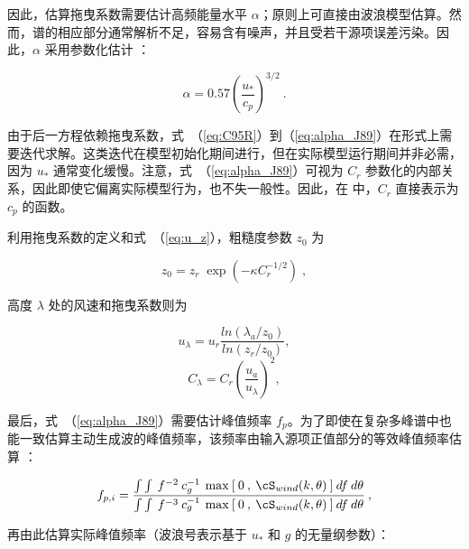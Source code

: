 因此，估算拖曳系数需要估计高频能量水平 $\alpha$；原则上可直接由波浪模型估算。然而，谱的相应部分通常解析不足，容易含有噪声，并且受若干源项误差污染。因此，$\alpha$ 采用参数化估计 \citep{art:Jan89}：


\begin{equation}
\alpha = 0.57 \left ( \frac{u_\ast}{c_p} \right )^{3/2}
\: . \label{eq:alpha_J89} \end{equation}

\noindent
由于后一方程依赖拖曳系数，式~（\ref{eq:C95R}）到（\ref{eq:alpha_J89}）在形式上需要迭代求解。这类迭代在模型初始化期间进行，但在实际模型运行期间并非必需，因为 $u_\ast$ 通常变化缓慢。注意，式~（\ref{eq:alpha_J89}）可视为 $C_r$ 参数化的内部关系，因此即使它偏离实际模型行为，也不失一般性。因此，在 \cite{tol:JPO96} 中，$C_r$ 直接表示为 $c_p$ 的函数。

利用拖曳系数的定义和式~（\ref{eq:u_z}），粗糙度参数 $z_0$ 为


\begin{equation}
z_0 = z_r \; \exp \left ( - \kappa C_r^{-1/2} \right )
\; , \label{eq:z0} \end{equation}

\noindent
高度 $\lambda$ 处的风速和拖曳系数则为


\begin{equation}
u_{\lambda} = u_r \frac{ln(\lambda_a/z_0)}{ln(z_r/z_0)},
\label{eq:ul} \end{equation} \begin{equation}
C_{\lambda} = C_r \left ( \frac{u_a}{u_\lambda}
\right ) ^2 ,\label{eq:Cl}
\end{equation}

\noindent
最后，式~（\ref{eq:alpha_J89}）需要估计峰值频率 $f_p$。为了即使在复杂多峰谱中也能一致估算主动生成波的峰值频率，该频率由输入源项正值部分的等效峰值频率估算 \citep[见][]{tol:JPO96}：


\begin{equation}
f_{p,i} =
\frac { \int \int \: f^{-2} \: c_g^{-1} \:
\max \: [ \: 0 \:,\: \cS_{wind}(k,\theta) \: ] \: d f \: d\theta }
{ \int \int \: f^{-3} \: c_g^{-1} \:
\max \: [ \: 0 \:,\: \cS_{wind}(k,\theta) \: ] \: d f \: d\theta }
\: , \label{eq:fp_ir}
\end{equation}

\noindent
再由此估算实际峰值频率（波浪号表示基于 $u_\ast$ 和 $g$ 的无量纲参数）：

